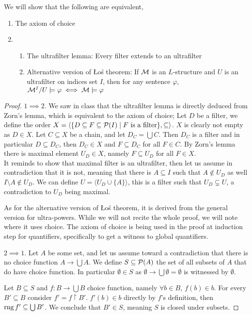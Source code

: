 \question{}
We will show that the following are equivalent,
\begin{enumerate}
	\item The axiom of choice
	\item
		\begin{enumerate}
			\item The ultrafilter lemma: Every filter extends to an ultrafilter
			\item Alternative version of Łoś theorem: If $\mathcal{M}$ is an $L$-structure and $U$ is an ultrafilter on indices set $I$, then for any sentence $\varphi$, $\mathcal{M}^I / U \models \varphi \iff \mathcal{M} \models \varphi$
		\end{enumerate}
\end{enumerate}
\begin{proof}
	$1 \implies 2$.
	We saw in class that the ultrafilter lemma is directly deduced from Zorn's lemma, which is equivalent to the axiom of choice;
	Let $D$ be a filter, we define the order $X = \langle \{ D \subseteq F \subseteq \mathcal{P}(I) \mid F \text{ is a filter} \}, \subseteq \rangle$.
	$X$ is clearly not empty as $D \in X$. Let $C \subseteq X$ be a chain, and let $D_C = \bigcup C$.
	Then $D_C$ is a filter and in particular $D \subseteq D_C$, then $D_C \in X$ and $F \subseteq D_C$ for all $F \in C$.
	By Zorn's lemma there is maximal element $U_D \in X$, namely $F \subseteq U_D$ for all $F \in X$. \\
	It reminds to show that maximal filter is an ultrafilter, then let us assume in contradiction that it is not, meaning that there is $A \subseteq I$ such that $A \notin U_D$ as well $I \setminus A \notin U_D$.
	We can define $U = \langle U_D \cup \{ A \} \rangle$, this is a filter such that $U_D \subsetneq U$, a contradiction to $U_D$ being maximal.

	As for the alternative version of Łoś theorem, it is derived from the general version for ultra-powers.
	While we will not recite the whole proof, we will note where it uses choice.
	The axiom of choice is being used in the proof at induction step for quantifiers, specifically to get a witness to global quantifiers.

	$2 \implies 1$.
	Let $A$ be some set, and let us assume toward a contradiction that there is no choice function $A \to \bigcup A$.
	We define $S \subseteq \mathcal{P}(A)$ the set of all subsets of $A$ that do have choice function.
	In particular $\emptyset \in S$ as $\emptyset \to \bigcup \emptyset = \emptyset$ is witnessed by $\emptyset$.

	Let $B \subseteq S$ and $f : B \to \bigcup B$ choice function, namely $\forall b \in B,\ f(b) \in b$.
	For every $B' \subseteq B$ consider $f' = f \restriction B'$.
	$f'(b) \in b$ directly by $f$'s definition, then $\operatorname{rng} f' \subseteq \bigcup B'$.
	We conclude that $B' \in S$, meaning $S$ is closed under subsets.


\end{proof}
